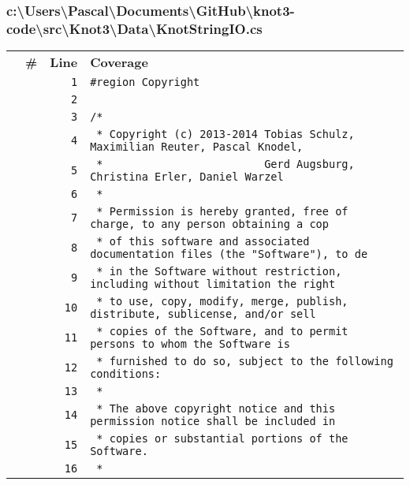 \documentclass[a4paper,10pt]{article}
\begin{document}
\subsubsection{c:\textbackslash Users\textbackslash Pascal\textbackslash Documents\textbackslash GitHub\textbackslash knot3-code\textbackslash src\textbackslash Knot3\textbackslash Data\textbackslash KnotStringIO.cs}
\begin{longtable}[l]{lrrl}
\textbf{} & \textbf{\#} & \textbf{Line} & \textbf{Coverage}\\
\cellcolor{gray} &  & \verb~1~ & \verb~#region Copyright~\\
\cellcolor{gray} &  & \verb~2~ & \verb~~\\
\cellcolor{gray} &  & \verb~3~ & \verb~/*~\\
\cellcolor{gray} &  & \verb~4~ & \verb~ * Copyright (c) 2013-2014 Tobias Schulz, Maximilian Reuter, Pascal Knodel,~\\
\cellcolor{gray} &  & \verb~5~ & \verb~ *                         Gerd Augsburg, Christina Erler, Daniel Warzel~\\
\cellcolor{gray} &  & \verb~6~ & \verb~ *~\\
\cellcolor{gray} &  & \verb~7~ & \verb~ * Permission is hereby granted, free of charge, to any person obtaining a cop~\\
\cellcolor{gray} &  & \verb~8~ & \verb~ * of this software and associated documentation files (the "Software"), to de~\\
\cellcolor{gray} &  & \verb~9~ & \verb~ * in the Software without restriction, including without limitation the right~\\
\cellcolor{gray} &  & \verb~10~ & \verb~ * to use, copy, modify, merge, publish, distribute, sublicense, and/or sell~\\
\cellcolor{gray} &  & \verb~11~ & \verb~ * copies of the Software, and to permit persons to whom the Software is~\\
\cellcolor{gray} &  & \verb~12~ & \verb~ * furnished to do so, subject to the following conditions:~\\
\cellcolor{gray} &  & \verb~13~ & \verb~ *~\\
\cellcolor{gray} &  & \verb~14~ & \verb~ * The above copyright notice and this permission notice shall be included in ~\\
\cellcolor{gray} &  & \verb~15~ & \verb~ * copies or substantial portions of the Software.~\\
\cellcolor{gray} &  & \verb~16~ & \verb~ *~\\

\end{longtable}
\end{document}
